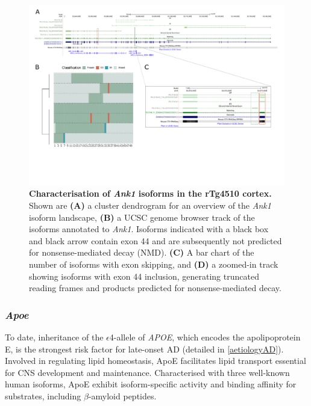 \begin{landscape}
	\begin{figure}[htp]
		\centering
		\captionsetup{width=1.3\textwidth}
		\includegraphics[page=3,trim={0 1.5cm 0 0},scale = 0.85]{Figures/TargetGenes_Annotation_Landscape.pdf}
		\caption[Characterisation of \textit{Ank1} isoforms]%
		{\textbf{Characterisation of \textit{Ank1} isoforms in the rTg4510 cortex.} Shown are \textbf{(A)} a cluster dendrogram for an overview of the \textit{Ank1} isoform landscape, \textbf{(B)} a UCSC genome browser track of the isoforms annotated to \textit{Ank1}. Isoforms indicated with a black box and black arrow contain exon 44 and are subsequently not predicted for nonsense-mediated decay (NMD). \textbf{(C)} A bar chart of the number of isoforms with exon skipping, and \textbf{(D)} a zoomed-in track showing isoforms with exon 44 inclusion, generating truncated reading frames and products predicted for nonsense-mediated decay. }    
		\label{fig:ank1}
	\end{figure}
\end{landscape}
\restoregeometry

\newpage
\subsubsection{\textit{Apoe}}
\label{ch6: apoe}
To date, inheritance of the $\epsilon$4-allele of \textit{APOE}, which encodes the apolipoprotein E, is the strongest risk factor for late-onset AD (detailed in \cref{aetiologyAD}). Involved in regulating lipid homeostasis, ApoE facilitates lipid transport essential for CNS development and maintenance. Characterised with three well-known human isoforms, ApoE exhibit isoform-specific activity and binding affinity for substrates, including $\beta$-amyloid peptides\cite{Jablonski2021}. 

